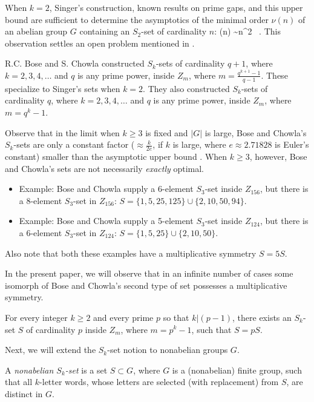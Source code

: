 When $k = 2$, Singer's construction, known results on prime gaps,
and this upper bound are sufficient to determine the asymptotics of
the minimal order $\nu ( n )$ of an abelian group $G$
containing an $S_2$-set of cardinality $n$:
\nu (n) \sim n^2 ~.
\eeq
This observation settles an open problem mentioned in \cite[p.~1343]{BSSS90}.

R.C. Bose and S. Chowla \cite{Bose62} constructed $S_k$-sets of cardinality
$q+1$, where $k = 2 , 3 , 4 , \dots$ and $q$ is any prime power,
inside $Z_m$, where $m = \frac{q^{k+1} - 1}{q-1}$.
These specialize to Singer's sets when $k=2$.
They also constructed $S_k$-sets of cardinality
$q$, where $k = 2 , 3 , 4 , \dots$ and $q$ is any prime power,
inside $Z_m$, where
$m = q^k - 1$.

Observe that in the limit when $k \ge 3$ is fixed and $|G|$
is large,
Bose and Chowla's $S_k$-sets are only
a constant factor ($\approx \frac{k}{2e}$, if $k$ is large,
where $e \approx 2.71828$ is Euler's constant) smaller than the 
asymptotic upper bound .
When $k \ge 3$, however,
Bose and Chowla's sets are not necessarily {\it exactly} optimal.
\begin{itemize}
\item Example: Bose and Chowla supply
a 6-element $S_3$-set inside $Z_{156}$,
but there is a 8-element $S_3$-set in $Z_{156}$:
$S = \{ 1 , 5 , 25 , 125 \} \cup \{ 2 , 10 , 50 , 94 \}$.
\item Example: Bose and Chowla supply
a 5-element $S_3$-set inside $Z_{124}$,
but there is a 6-element $S_3$-set in $Z_{124}$:
$S = \{ 1 , 5 , 25 \} \cup \{ 2 , 10 , 50 \}$.
\end{itemize}
Also note that both these examples have a multiplicative
symmetry $S = 5S$.

In the present paper, we will observe that in an infinite
number of cases some isomorph of Bose and
Chowla's second type of set possesses a multiplicative
symmetry.

\begin{theo}\label{th1}
For every integer $k \ge 2$ and every prime $p$ so that $k | (p-1)$,
there exists an $S_k$-set $S$ of cardinality
$p$ inside $Z_m$, where $m = p^k - 1$,
such that $S = p S$.
\end{theo}

Next, we will extend the $S_k$-set notion to nonabelian groups $G$.

\begin{defn}\label{de3}
{\rm
A {\em nonabelian $S_k$-set} is a
set $S \subset G$, where $G$ is a (nonabelian) finite group,
such that all
$k$-letter words, whose letters are selected (with replacement) from $S$,
are distinct in $G$.
}
\end{defn}

